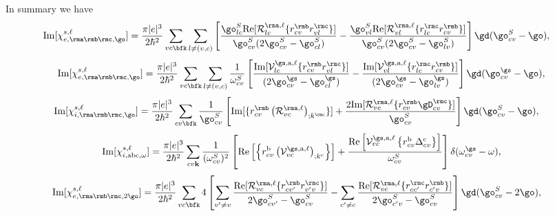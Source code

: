 In summary we have
\begin{align}\label{imchiew}
\mathrm{Im}[\chi_{e,\rma\rmb\rmc,\go}^{s,\ell}]
&=
\frac{\pi |e|^3}{2\hbar^2} 
\sum_{vc\bfk}
\sum_{l\neq(v,c)}
\left[
\frac{\go^S_{lc}\mathrm{Re}[{\cal R}^{\rma,\ell}_{lc}\{r^{\rmb}_{cv}r^{\rmc}_{vl}\}]}
{\go^S_{cv}(2\go^S_{cv}-\go^S_{cl})}
-
\frac{\go^S_{vl}\mathrm{Re}[{\cal R}^{\rma,\ell}_{vl}\{r^{\rmc}_{lc}r^{\rmb}_{cv}\}]}
{\go^S_{cv}(2\go^S_{cv}-\go^S_{lv})}
\right]
\gd(\go^S_{cv}-\go)
,
\end{align}  
\begin{equation}\label{c-calvimchiewn}
\mathrm{Im}[\chi_{e,\rma\rmb\rmc,\go}^{s,\ell}] =
\frac{\pi |e|^3}{2\hbar^2}\sum_{vc\bfk}\sum_{l\neq(v,c)}\frac{1}{\omega^{S}_{cv}}
\left[
\frac{\mathrm{Im}[\mathcal{V}^{\gs,\text{a},\ell}_{lc}\{r^{\rmb}_{cv}r^{\rmc}_{vl}\}]}
{(2\go^\gs_{cv}-\go^\gs_{cl})} 
-\frac{\mathrm{Im}[\mathcal{V}^{\gs,\text{a},\ell}_{vl}\{r^{\rmc}_{lc}r^{\rmb}_{cv}\}]}
{(2\go^\gs_{cv}-\go^\gs_{lv})}
\right]\gd(\go^\gs_{cv}-\go),
\end{equation}  
\begin{align}\label{imchiwf}
\mathrm{Im}[\chi_{i,\rma\rmb\rmc,\go}^{s,\ell}]
&=
\frac{\pi|e|^3}{2\hbar^2}
\sum_{cv\bfk}
\frac{1}{\go^S_{cv}}
\left[
\mathrm{Im}[\{r^{\rmb}_{cv}\left({\cal R}^{\rma,\ell}_{vc}\right)_{;k^{\rmc}}\}]
+
\frac{2\mathrm{Im}[{\cal R}^{\rma,\ell}_{vc}\{r^{\rmb}_{cv}\gD^{\rmc}_{cv}\}]}{\go^S_{cv}}
\right]
\gd(\go^S_{cv}-\go)
,
\end{align}
\begin{equation}\label{c-calvimchiwn}
\mathrm{Im}[\chi_{i,\text{a}\text{b}\text{c},\omega}^{s,\ell}]
= \frac{\pi\vert e\vert^3}{2\hbar^2}\sum_{cv\mathbf{k}}\frac{1}{(\omega^{S}_{cv})^{2}}
\left[
\mathrm{Re}\left[\left\{r^{\text{b}}_{cv}\left(\mathcal{V}^{\gs,\text{a},\ell}_{vc}\right)_{;k^{\text{c}}}\right\}\right]
+\frac{\mathrm{Re}\left[\mathcal{V}^{\gs,\text{a},\ell}_{vc}\left\{r^{\text{b}}_{cv}
\Delta^{\text{c}}_{cv}\right\}\right]}{\omega^{S}_{cv}} 
\right]\delta(\omega^\gs_{cv}-\omega),
\end{equation}
\begin{align}\label{imchie2w}
\mathrm{Im}[\chi_{e,\rma\rmb\rmc,2\go}^{s,\ell}]
&=
\frac{\pi |e|^3}{2\hbar^2} 
\sum_{vc\bfk} 
4
\left[
\sum_{v'\ne v}
\frac{\mathrm{Re}[{\cal
    R}^{\rma,\ell}_{vc}\{r^{\rmb}_{cv'}r^{\rmc}_{v'v}\}]}{2\go^S_{cv'}-\go^S_{cv}}
-
\sum_{c'\ne c}
\frac{\mathrm{Re}[{\cal R}^{\rma,\ell}_{vc}\{r^{\rmc}_{cc'}r^{\rmb}_{c'v}\}]}
{2\go^S_{c'v}-\go^S_{cv}}
\right]
\gd(\go^S_{cv}-2\go)
,
\end{align}  
